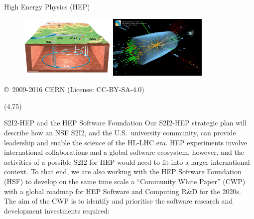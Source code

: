 \documentclass[final]{beamer}
\begin{document}
\begin{frame}{}
\begin{textblock}{38.0}
\begin{block}{High Energy Physics (HEP)}
\begin{figure}[tbph]
\centering
\includegraphics[width=0.41\textwidth]{images/CERN-LHC-cutaway-view-medium.png}
\includegraphics[width=0.42\textwidth]{images/eemm_run195099_evt137440354_ispy_3d-annotated-2.png}
\end{figure}
{\small \copyright~2009-2016 CERN (License: CC-BY-SA-4.0)}
\end{block}
\end{textblock}



\begin{textblock}{38.0}(4,75)
\begin{block}{S2I2-HEP and the HEP Software Foundation}
Our S2I2-HEP strategic plan will describe how an NSF S2I2, and the U.S.\ university community, can provide leadership and enable the science of the HL-LHC era.
HEP experiments involve international collaborations and a global software ecosystem, however, and the activities of a possible S2I2 for HEP would need to fit into a larger international context. To that end, we are also working with the HEP Software Foundation (HSF) to develop on the same time scale a ``Community White Paper'' (CWP) with a global roadmap for HEP Software and Computing R\&D for the 2020s. The aim of the CWP is to identify and prioritise the software research and development investments required:


\end{block}
\end{textblock}
\end{frame}
\end{document}
